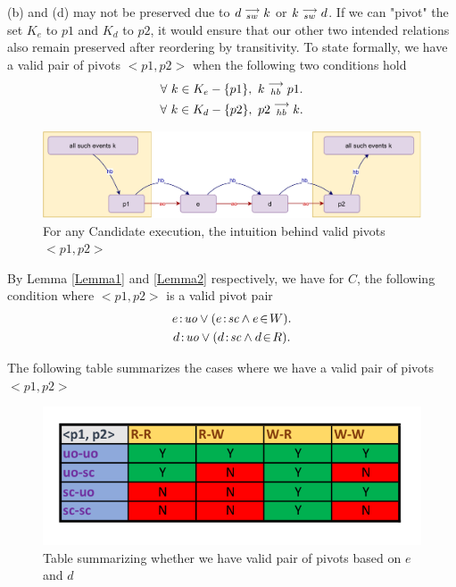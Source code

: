     (b) and (d) may not be preserved due to $d\stackrel{\longrightarrow}{_{sw}}k$ or $k\stackrel{\longrightarrow}{_{sw}}d$. If we can "pivot" the  set $K_e$ to $p1$ and $K_d$ to $p2$, it would ensure that our other two intended relations also remain preserved after reordering by transitivity. To state formally, we have a valid pair of pivots $<p1,p2>$ when the following two conditions hold
    \begin{gather*}
        \forall \ k \in K_e - \{p1\}, \ k\stackrel{\longrightarrow}{_{hb}}p1. \\
        \forall \ k \in K_d - \{p2\}, \ p2\stackrel{\longrightarrow}{_{hb}}k.
    \end{gather*}
    
    \begin{figure}[H]
        \centering
        \includegraphics[scale=0.7]{InstructionReordering/ValidReorderingProof/ProofParts/Part1/part1(d).pdf}
        \caption{For any Candidate execution, the intuition behind valid pivots $<p1,p2>$}
        \label{fig:my_label}
    \end{figure}
    
    By Lemma \ref{Lemma1} and \ref{Lemma2} respectively, we have for $C$, the following condition where $<p1, p2>$ is a valid pivot pair
    \begin{gather*}
        \et{e}{uo} \vee (\et{e}{sc} \wedge \event{e}{W}). \\
        \et{d}{uo} \vee (\et{d}{sc} \wedge \event{d}{R}).
    \end{gather*}
        
    The following table summarizes the cases where we have a valid pair of pivots\footnotemark $<p1,p2>$
    \begin{figure}[H]
        \centering
        \includegraphics[scale=0.7]{InstructionReordering/ValidReorderingProof/ProofParts/Part1/part1_table.pdf}
        \caption{Table summarizing whether we have valid pair of pivots based on  $e$ and $d$}
        \label{fig:my_label}
    \end{figure}
            
